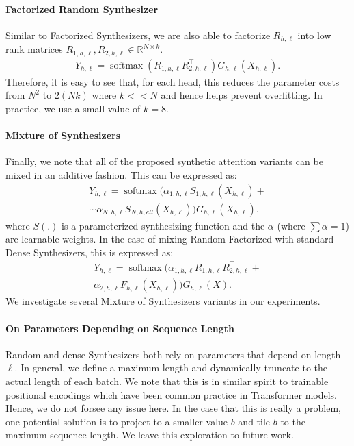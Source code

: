 \documentclass{article}
\DeclareMathOperator{\softmax}{softmax}
\begin{document}
\paragraph{Factorized Random Synthesizer}
Similar to Factorized Synthesizers, we are also able to factorize $R_{h,\ell}$ into low rank matrices $R_{1,h,\ell},R_{2,h,\ell} \in \mathbb{R}^{N \times k}$.
\begin{align}
Y_{h,\ell} = \softmax(R_{1,h,\ell}R_{2,h,\ell}^{\top})G_{h,\ell}(X_{h,\ell}).    
\end{align}
Therefore, it is easy to see that, for each head, this reduces the parameter costs from $N^2$ to $2(N k)$ where $k << N$ and hence helps prevent overfitting. In practice, we use a small value of $k=8$. 



\paragraph{Mixture of Synthesizers} Finally, we note that all of the proposed synthetic attention variants can be mixed in an additive fashion. This can be expressed as:
\begin{align*}
Y_{h,\ell} = \softmax(\alpha_{1,h,\ell} S_{1,h,\ell}(X_{h,\ell})+ \\ 
\cdots \alpha_{N,h,\ell} S_{N,h,ell}(X_{h,\ell}))G_{h,\ell}(X_{h,\ell}).   
\end{align*}
where $S(.)$ is a parameterized synthesizing function and the $\alpha$ (where $\sum \alpha = 1$) are learnable weights. In the case of mixing Random Factorized with standard Dense Synthesizers, this is expressed as:
\begin{align*}
Y_{h,\ell} = \softmax(\alpha_{1,h,\ell} R_{1,h,\ell}R_{2,h,\ell}^{\top}+ \\ \alpha_{2,h,\ell}F_{h,\ell}(X_{h,\ell}))G_{h,\ell}(X).    
\end{align*}
We investigate several Mixture of Synthesizers variants in our experiments.
\paragraph{On Parameters Depending on Sequence Length}
Random and dense Synthesizers both rely on parameters that depend on length $\ell$. In general, we define a maximum length and dynamically truncate to the actual length of each batch. We note that this is in similar spirit to trainable positional encodings which have been common practice in Transformer models. Hence, we do not forsee any issue here. In the case that this is really a problem, one potential solution is to project to a smaller value $b$ and tile $b$ to the maximum sequence length. We leave this exploration to future work.
\end{document}
